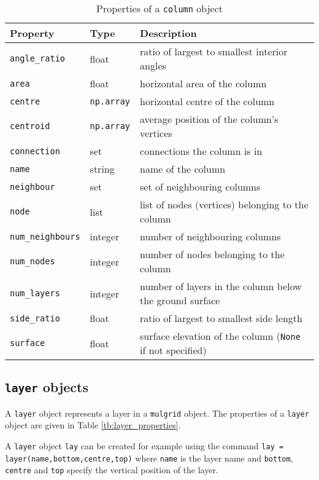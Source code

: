 \begin{table}
  \begin{center}
    \begin{tabular}{|l|l|l|}
      \hline
      \textbf{Property} & \textbf{Type} & \textbf{Description}\\
      \hline
      \texttt{angle\_ratio} & float & ratio of largest to smallest interior angles \\
      \texttt{area} & float & horizontal area of the column \\
      \texttt{centre} & \texttt{np.array} & horizontal centre of the column \\
      \texttt{centroid} & \texttt{np.array} & average position of the column's vertices \\
      \texttt{connection} & set & connections the column is in \\
      \texttt{name} & string & name of the column \\
      \texttt{neighbour} & set & set of neighbouring columns \\
      \texttt{node} & list & list of nodes (vertices) belonging to the column \\
      \texttt{num\_neighbours} & integer & number of neighbouring columns \\
      \texttt{num\_nodes} & integer & number of nodes belonging to the column \\
      \texttt{num\_layers} & integer & number of layers in the column below the ground surface \\
      \texttt{side\_ratio} & float & ratio of largest to smallest side length \\
      \texttt{surface} & float & surface elevation of the column (\texttt{None} if not specified)\\
      \hline
    \end{tabular}
    \caption{Properties of a \texttt{column} object}
    \label{tb:column_properties}
  \end{center}
\end{table}

\subsection{\texttt{layer} objects}

A \texttt{layer} object represents a layer in a \texttt{mulgrid} object. The properties of a \texttt{layer} object are given in Table \ref{tb:layer_properties}.

A \texttt{layer} object \texttt{lay} can be created for example using the command \texttt{lay = layer(name,bottom,centre,top)} where \texttt{name} is the layer name and \texttt{bottom}, \texttt{centre} and \texttt{top} specify the vertical position of the layer.

